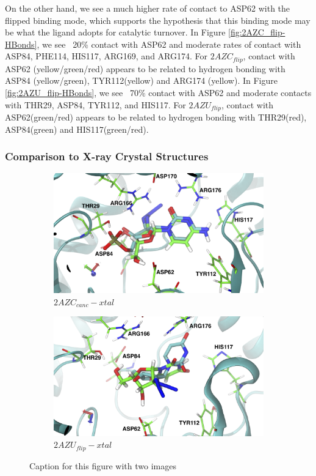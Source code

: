 \documentclass[fleqn,10pt]{wlscirep}
\begin{document}
On the other hand, we see a much higher rate of contact to ASP62 with the flipped binding mode, which supports the hypothesis that this binding mode may be what the ligand adopts for catalytic turnover.
In Figure \ref{fig:2AZC_flip-HBonds}, we see ~20\% contact with ASP62 and moderate rates of contact with ASP84, PHE114, HIS117, ARG169, and ARG174.
For $2AZC_{flip}$, contact with ASP62 (yellow/green/red) appears to be related to hydrogen bonding with ASP84 (yellow/green), TYR112(yellow) and ARG174 (yellow).
In Figure \ref{fig:2AZU_flip-HBonds}, we see ~70\% contact with ASP62 and moderate contacts with THR29, ASP84, TYR112, and HIS117.
For $2AZU_{flip}$, contact with ASP62(green/red) appears to be related to hydrogen bonding with THR29(red), ASP84(green) and HIS117(green/red).

\subsubsection{Comparison to X-ray Crystal Structures}

\begin{figure}[!ht]
\centering
\begin{subfigure}{.5\textwidth}
  \centering
  \includegraphics[width=.9\linewidth]{xtal/2AZC_canc-xtal_front.png}
  \caption{$2AZC_{canc}-xtal$}
  \label{fig:2AZC-xtal}
\end{subfigure}%
\begin{subfigure}{.5\textwidth}
  \centering
  \includegraphics[width=.9\linewidth]{xtal/2AZU_flip-xtal_front.png}
  \caption{$2AZU_{flip}-xtal$}
  \label{fig:2AZU-xtal}
\end{subfigure}
\caption{Caption for this figure with two images}
\label{fig:xtal}
\end{figure}
\end{document}
